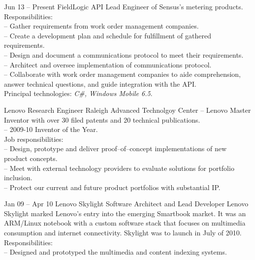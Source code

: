 \documentclass[a4paper, 10pt]{article}
\begin{document}
\begin{resume}
\begin{project} {Jun 13 -- Present} {FieldLogic API} {Lead Engineer}
            of Sensus's metering products.
            \\[1ex]
            Responsibilities: \\
            -- Gather requirements from work order management companies. \\
            -- Create a development plan and schedule for fulfillment of gathered requirements. \\
            -- Design and document a communications protocol to meet their requirements. \\
            -- Architect and oversee implementation of communications protocol. \\
            -- Collaborate with work order management companies to aide comprehension,
            answer technical questions, and guide integration with the API.
            \\[1ex]
            Principal technologies: \emph{C\#, Windows Mobile 6.5}.
        \end{project}
        \begin{position} {Lenovo} {Research Engineer} {Raleigh Advanced Technolgoy Center}
            -- Lenovo Master Inventor with over 30 filed patents and 20 technical publications. \\
            -- 2009-10 Inventor of the Year.
            \\[1ex]
            Job responsibilities: \\
            -- Design, prototype and deliver proof--of--concept implementations of new product concepts. \\
            -- Meet with external technology providers to evaluate solutions for portfolio inclusion. \\
            -- Protect our current and future product portfolios with substantial IP.
        \end{position}
        \begin{project} {Jan 09 -- Apr 10} {Lenovo Skylight} {Software Architect and Lead Developer}
            Lenovo Skylight marked Lenovo's entry into the emerging Smartbook market.
            It was an ARM/Linux notebook with a custom software stack that focuses
            on multimedia consumption and internet connectivity.
            Skylight was to launch in July of 2010.
            \\[1ex]
            Responsibilities: \\
            -- Designed and prototyped the multimedia and content indexing systems. \\

\end{project}
\end{resume}
\end{document}
